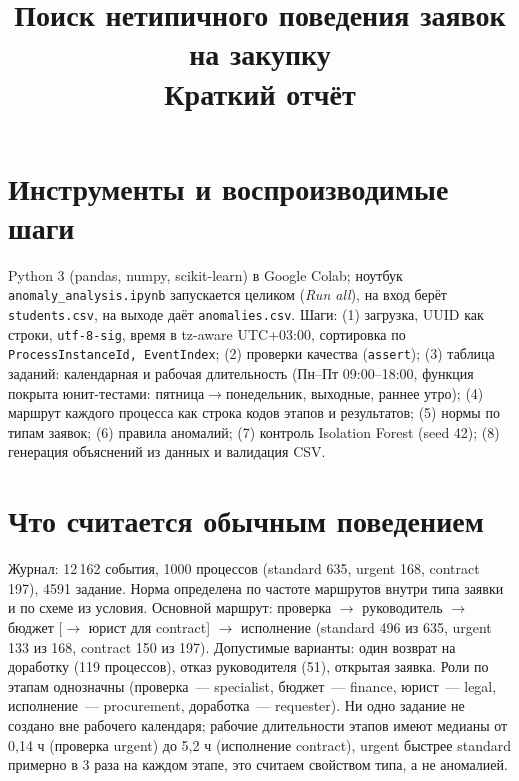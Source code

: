 \documentclass[10pt,a4paper]{article}
\title{Поиск нетипичного поведения заявок на закупку\\\large Краткий отчёт}
\author{}\date{}
\begin{document}
\maketitle\vspace{-2.2em}

\section{Инструменты и воспроизводимые шаги}
Python 3 (pandas, numpy, scikit-learn) в Google Colab; ноутбук \texttt{anomaly\_analysis.ipynb} запускается целиком (\emph{Run all}), на вход берёт \texttt{students.csv}, на выходе даёт \texttt{anomalies.csv}. Шаги: (1) загрузка, UUID как строки, \texttt{utf-8-sig}, время в tz-aware UTC+03:00, сортировка по \texttt{ProcessInstanceId, EventIndex}; (2) проверки качества (\texttt{assert}); (3) таблица заданий: календарная и рабочая длительность (Пн--Пт 09:00--18:00, функция покрыта юнит-тестами: пятница$\to$понедельник, выходные, раннее утро); (4) маршрут каждого процесса как строка кодов этапов и результатов; (5) нормы по типам заявок; (6) правила аномалий; (7) контроль Isolation Forest (seed 42); (8) генерация объяснений из данных и валидация CSV.

\section{Что считается обычным поведением}
Журнал: 12\,162 события, 1000 процессов (standard 635, urgent 168, contract 197), 4591 задание. Норма определена по частоте маршрутов внутри типа заявки и по схеме из условия. Основной маршрут: проверка $\to$ руководитель $\to$ бюджет [$\to$ юрист для contract] $\to$ исполнение (standard 496 из 635, urgent 133 из 168, contract 150 из 197). Допустимые варианты: один возврат на доработку (119 процессов), отказ руководителя (51), открытая заявка. Роли по этапам однозначны (проверка~--- specialist, бюджет~--- finance, юрист~--- legal, исполнение~--- procurement, доработка~--- requester). Ни одно задание не создано вне рабочего календаря; рабочие длительности этапов имеют медианы от 0,14 ч (проверка urgent) до 5,2 ч (исполнение contract), urgent быстрее standard примерно в 3 раза на каждом этапе, это считаем свойством типа, а не аномалией.
\end{document}
